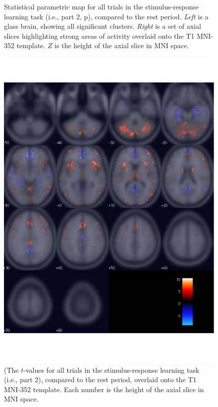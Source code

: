 \documentclass[doc,12pt]{apa}        %
\begin{document}
\begin{figure}[tp]
    \centering
    \caption{Statistical parametric map for all trials in the stimulus-response learning task (i.e., part 2, p\pageref{subsub:whatwhen}), compared to the rest period.  \emph{Left} is a glass brain, showing all significant clusters.  \emph{Right} is a set of axial slices highlighting strong areas of activity overlaid onto the T1 MNI-352 template.  $Z$ is the height of the axial slice in MNI space.}
	\label{fig:gl}
\end{figure}

\begin{figure}[tp]
	\includegraphics{f_map_gl_raw_t}
    \centering
	\caption{(The $t$-values for all trials in the stimulus-response learning task (i.e., part 2), compared to the rest period,  overlaid onto the T1 MNI-352 template.   Each number is the height of the axial slice in MNI space.}
	\label{fig:glraw}
\end{figure}
\end{document}

